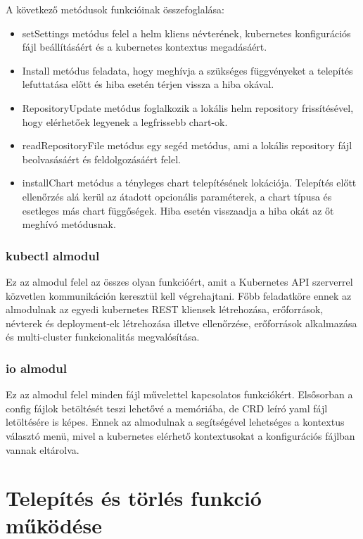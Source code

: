 A következő metódusok funkcióinak összefoglalása:
\begin{itemize}
    \item setSettings metódus felel a helm kliens névterének, kubernetes konfigurációs fájl beállításáért és a kubernetes kontextus megadásáért.
    \item Install metódus feladata, hogy meghívja a szükséges függvényeket a telepítés lefuttatása előtt és hiba esetén térjen vissza a hiba okával.
    \item RepositoryUpdate metódus foglalkozik a lokális helm repository frissítésével, hogy elérhetőek legyenek a legfrissebb chart-ok.
    \item readRepositoryFile metódus egy segéd metódus, ami a lokális repository fájl beolvasásáért és feldolgozásáért felel.
    \item installChart metódus a tényleges chart telepítésének lokációja. Telepítés előtt ellenőrzés alá kerül az átadott opcionális paraméterek, a chart típusa és esetleges más chart függőségek. Hiba esetén visszaadja a hiba okát az őt meghívó metódusnak.
\end{itemize}

\subsubsection*{kubectl almodul}
Ez az almodul felel az összes olyan funkcióért, amit a Kubernetes API szerverrel közvetlen kommunikáción keresztül kell végrehajtani.
Főbb feladatköre ennek az almodulnak az egyedi kubernetes REST kliensek létrehozása, erőforrások, névterek és deployment-ek létrehozása illetve ellenőrzése, erőforrások alkalmazása és multi-cluster funkcionalitás megvalósítása.

\subsubsection*{io almodul}
Ez az almodul felel minden fájl művelettel kapcsolatos funkciókért.
Elsősorban a config fájlok betöltését teszi lehetővé a memóriába, de CRD leíró yaml fájl letöltésére is képes.
Ennek az almodulnak a segítségével lehetséges a kontextus választó menü, mivel a kubernetes elérhető kontextusokat a konfigurációs fájlban vannak eltárolva.

\section{Telepítés és törlés funkció működése}

